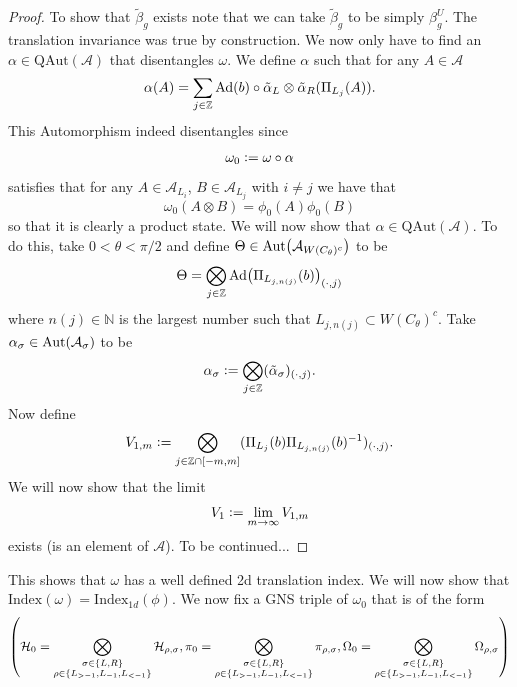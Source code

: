 \documentclass[12pt,a4paper,twoside]{article}
\newcommand{\defeq}{\vcentcolon=}
\let\originalleft\left
\let\originalright\right
\renewcommand{\left}{\mathopen{}\mathclose\bgroup\originalleft}
\renewcommand{\right}{\aftergroup\egroup\originalright}
\newcommand{\HH}{\mathcal H}
\newcommand{\ZZ}{\mathbb Z}
\renewcommand{\AA}{\mathcal A}
\newcommand{\NN}{\mathbb{N}}
\newcommand{\Ad}[1]{\textrm{Ad}\left(#1\right)}
\newcommand{\Aut}[1]{\textrm{Aut}\left(#1\right)}
\theoremstyle{definition}
\numberwithin{equation}{section}
\begin{document}
\begin{proof}
	To show that $\tilde{\beta}_g$ exists note that we can take $\tilde{\beta}_g$ to be simply $\beta_g^{U}$. The translation invariance was true by construction. We now only have to find an $\alpha\in\textrm{QAut}(\AA)$ that disentangles $\omega$. We define $\alpha$ such that for any $A\in\AA$
	\begin{equation}
		\alpha(A)=\sum_{j\in\ZZ}\Ad{b}\circ\tilde{\alpha}_L\otimes\tilde{\alpha}_R(\Pi_{L_j}(A)).
	\end{equation}
	This Automorphism indeed disentangles since
	\begin{equation}
		\omega_0\defeq \omega\circ\alpha
	\end{equation}
	satisfies that for any $A\in\AA_{L_{i}}$, $B\in\AA_{L_{j}}$ with $i\neq j$ we have that
	\begin{equation}
		\omega_0(A\otimes B)=\phi_0(A)\phi_0(B)
	\end{equation}
	so that it is clearly a product state. We will now show that $\alpha\in\textrm{QAut}(\AA)$. To do this, take $0<\theta<\pi/2$ and define $\Theta\in\Aut{\AA_{W(C_\theta)^c}}$ to be
	\begin{equation}
		\Theta=\bigotimes_{j\in\ZZ}\Ad{\Pi_{L_{j,n(j)}}(b)}_{(\cdot,j)}
	\end{equation}
	where $n(j)\in\NN$ is the largest number such that $L_{j,n(j)}\subset W(C_\theta)^c$. Take $\alpha_\sigma\in\Aut{\AA_\sigma}$ to be
	\begin{equation}
		\alpha_\sigma\defeq \bigotimes_{j\in\ZZ}(\tilde\alpha_\sigma)_{(\cdot,j)}.
	\end{equation}
	Now define
	\begin{equation}
		V_{1,m}\defeq\bigotimes_{j\in\ZZ\cap[-m,m]}(\Pi_{L_{j}}(b)\Pi_{L_{j,n(j)}}(b)^{-1})_{(\cdot,j)}.
	\end{equation}
	We will now show that the limit
	\begin{equation}
		V_1\defeq\lim_{m\rightarrow\infty}V_{1,m}
	\end{equation}
	exists (is an element of $\AA$). {\color{red}To be continued...}
\end{proof}
This shows that $\omega$ has a well defined 2d translation index. We will now show that $\textrm{Index}(\omega)=\textrm{Index}_{1d}(\phi)$. We now fix a GNS triple of $\omega_0$ that is of the form
\begin{equation}
	\left(\HH_0=\bigotimes_{\substack{\sigma\in\{L,R\}\\ \rho\in\{L_{>-1},L_{-1},L_{<-1}\}}}\HH_{\rho,\sigma},\pi_0=\bigotimes_{\substack{\sigma\in\{L,R\}\\ \rho\in\{L_{>-1},L_{-1},L_{<-1}\}}}\pi_{\rho,\sigma},\Omega_0=\bigotimes_{\substack{\sigma\in\{L,R\}\\ \rho\in\{L_{>-1},L_{-1},L_{<-1}\}}}\Omega_{\rho,\sigma}\right)
\end{equation}
\end{document}
